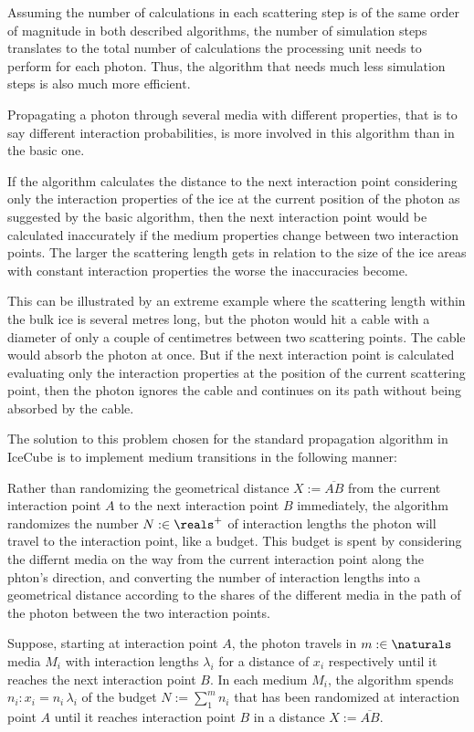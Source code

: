 \FloatBarrier

Assuming the number of calculations in each scattering step is of the same order of magnitude in both described algorithms, the number of simulation steps translates to the total number of calculations the processing unit needs to perform for each photon. Thus, the algorithm that needs much less simulation steps is also much more efficient.

Propagating a photon through several media with different properties, that is to say different interaction probabilities, is more involved in this algorithm than in the basic one.

If the algorithm calculates the distance to the next interaction point considering only the interaction properties of the ice at the current position of the photon as suggested by the basic algorithm, then the next interaction point would be calculated inaccurately if the medium properties change between two interaction points. The larger the scattering length gets in relation to the size of the ice areas with constant interaction properties the worse the inaccuracies become.

This can be illustrated by an extreme example where the scattering length within the bulk ice is several metres long, but the photon would hit a cable with a diameter of only a couple of centimetres between two scattering points. The cable would absorb the photon at once. But if the next interaction point is calculated evaluating only the interaction properties at the position of the current scattering point, then the photon ignores the cable and continues on its path without being absorbed by the cable.

The solution to this problem chosen for the standard propagation algorithm in IceCube is to implement medium transitions in the following manner:

Rather than randomizing the geometrical distance $X:=\overline{AB}$ from the current interaction point $A$ to the next interaction point $B$ immediately, the algorithm randomizes the number $N :\in \reals^+$ of interaction lengths the photon will travel to the interaction point, like a budget. This budget is spent by considering the differnt media on the way from the current interaction point along the phton's direction, and converting the number of interaction lengths into a geometrical distance according to the shares of the different media in the path of the photon between the two interaction points.

Suppose, starting at interaction point $A$, the photon travels in $m :\in \naturals$ media $M_i$ with interaction lengths $\lambda_i$ for a distance of $x_i$ respectively until it reaches the next interaction point $B$. In each medium $M_i$, the algorithm spends $n_i: x_i = n_i\,\lambda_i$ of the budget $N:=\sum_1^m n_i$ that has been randomized at interaction point $A$ until it reaches interaction point $B$ in a distance $X:=\overline{AB}$.

